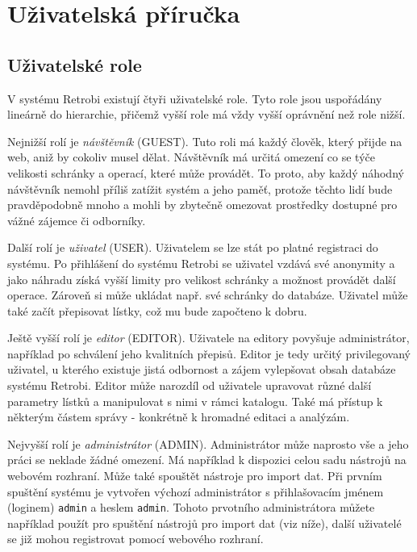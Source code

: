 \chapter{Uživatelská příručka}

\section{Uživatelské role}

V systému Retrobi existují čtyři uživatelské role. Tyto role jsou uspořádány lineárně do hierarchie, přičemž vyšší role má vždy vyšší oprávnění než role nižší. 

Nejnižší rolí je {\em návštěvník} (GUEST). Tuto roli má každý člověk, který přijde na web, aniž by cokoliv musel dělat. Návštěvník má určitá omezení co se týče velikosti schránky a operací, které může provádět. To proto, aby každý náhodný návštěvník nemohl příliš zatížit systém a jeho paměť, protože těchto lidí bude pravděpodobně mnoho a mohli by zbytečně omezovat prostředky dostupné pro vážné zájemce či odborníky.

Další rolí je {\em uživatel} (USER). Uživatelem se lze stát po platné registraci do systému. Po přihlášení do systému Retrobi se uživatel vzdává své anonymity a jako náhradu získá vyšší limity pro velikost schránky a možnost provádět další operace. Zároveň si může ukládat např. své schránky do databáze. Uživatel může také začít přepisovat lístky, což mu bude započteno k dobru.

Ještě vyšší rolí je {\em editor} (EDITOR). Uživatele na editory povyšuje administrátor, například po schválení jeho kvalitních přepisů. Editor je tedy určitý privilegovaný uživatel, u kterého existuje jistá odbornost a zájem vylepšovat obsah databáze systému Retrobi. Editor může narozdíl od uživatele upravovat různé další parametry lístků a manipulovat s nimi v rámci katalogu. Také má přístup k některým částem správy - konkrétně k hromadné editaci a analýzám.

Nejvyšší rolí je {\em administrátor} (ADMIN). Administrátor může naprosto vše a jeho práci se neklade žádné omezení. Má například k dispozici celou sadu nástrojů na webovém rozhraní. Může také spouštět nástroje pro import dat. Při prvním spuštění systému je vytvořen výchozí administrátor s přihlašovacím jménem (loginem) {\tt admin} a heslem {\tt admin}. Tohoto prvotního administrátora můžete například použít pro spuštění nástrojů pro import dat (viz níže), další uživatelé se již mohou registrovat pomocí webového rozhraní.

